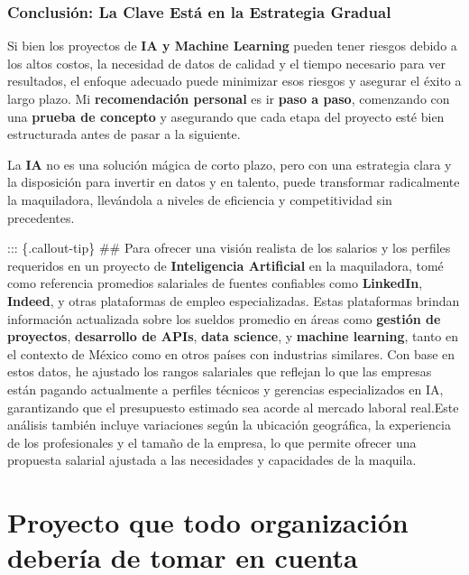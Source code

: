 \documentclass[
  10pt,
  letterpaper,
]{book}
\begin{document}
\subsubsection{\texorpdfstring{\textbf{Conclusión: La Clave Está en la
Estrategia
Gradual}}{Conclusión: La Clave Está en la Estrategia Gradual}}\label{conclusiuxf3n-la-clave-estuxe1-en-la-estrategia-gradual}

Si bien los proyectos de \textbf{IA y Machine Learning} pueden tener
riesgos debido a los altos costos, la necesidad de datos de calidad y el
tiempo necesario para ver resultados, el enfoque adecuado puede
minimizar esos riesgos y asegurar el éxito a largo plazo. Mi
\textbf{recomendación personal} es ir \textbf{paso a paso}, comenzando
con una \textbf{prueba de concepto} y asegurando que cada etapa del
proyecto esté bien estructurada antes de pasar a la siguiente.

La \textbf{IA} no es una solución mágica de corto plazo, pero con una
estrategia clara y la disposición para invertir en datos y en talento,
puede transformar radicalmente la maquiladora, llevándola a niveles de
eficiencia y competitividad sin precedentes.

::: \{.callout-tip\} \#\# Para ofrecer una visión realista de los
salarios y los perfiles requeridos en un proyecto de
\textbf{Inteligencia Artificial} en la maquiladora, tomé como referencia
promedios salariales de fuentes confiables como \textbf{LinkedIn},
\textbf{Indeed}, y otras plataformas de empleo especializadas. Estas
plataformas brindan información actualizada sobre los sueldos promedio
en áreas como \textbf{gestión de proyectos}, \textbf{desarrollo de
APIs}, \textbf{data science}, y \textbf{machine learning}, tanto en el
contexto de México como en otros países con industrias similares. Con
base en estos datos, he ajustado los rangos salariales que reflejan lo
que las empresas están pagando actualmente a perfiles técnicos y
gerencias especializados en IA, garantizando que el presupuesto estimado
sea acorde al mercado laboral real.Este análisis también incluye
variaciones según la ubicación geográfica, la experiencia de los
profesionales y el tamaño de la empresa, lo que permite ofrecer una
propuesta salarial ajustada a las necesidades y capacidades de la
maquila.

\section{Proyecto que todo organización debería de tomar en
cuenta}\label{proyecto-que-todo-organizaciuxf3n-deberuxeda-de-tomar-en-cuenta}
\end{document}
